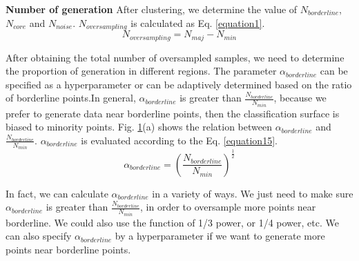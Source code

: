 \documentclass[ida]{iosart2x}
\begin{document}
\textbf{Number of generation} After clustering, 
we determine the value of $N_{borderline}$, 
$N_{core}$ and $N_{noise}$. 
$N_{oversampling}$ is calculated as Eq. \ref{equation1}.
\begin{equation}
  \label{equation1}
  N_{oversampling}=N_{maj}-N_{min}
\end{equation}

After obtaining the total number of oversampled samples, 
we need to determine the proportion of generation 
in different regions.
The parameter $\alpha_{borderline}$ can be specified as a hyperparameter or can be adaptively determined based on the ratio of borderline points.In general, $\alpha_{borderline}$ is greater than $\frac{N_{borderline}}{N_{min}}$,
because we prefer to generate data near borderline points,
then the classification surface is biased to minority points.
Fig. \ref{fig20}(a) shows the relation between $\alpha_{borderline}$ and $\frac{N_{borderline}}{N_{min}}$.
$\alpha_{borderline}$ is evaluated according to the Eq. \ref{equation15}.
\begin{equation}
  \label{equation15}
  \alpha_{borderline}=(\frac{N_{borderline}}{N_{min}})^{\frac{1}{2}}
\end{equation}

In fact, we can calculate $\alpha_{borderline}$ in a variety of ways. 
We just need to make sure $\alpha_{borderline}$ is greater 
than $\frac{N_{borderline}}{N_{min}}$, in order
to oversample more points near borderline. 
We could also use the function of 1/3 power, or 1/4 power, etc.
We can also specify $\alpha_{borderline}$ by a hyperparameter
if we want to generate more points near borderline points.
\begin{figure}[tb]
  \centering
  \quad
  \caption{}
  \label{fig20}
  \end{figure}
\end{document}
